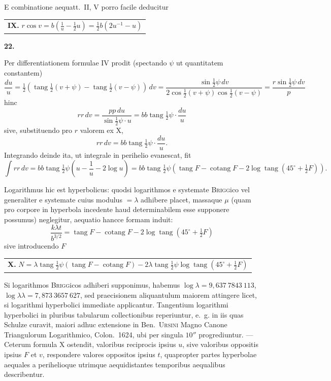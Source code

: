 \documentclass[12pt,a4paper]{book}
\newcommand{\tang}{\operatorname{tang}}
\newcommand{\cotang}{\operatorname{cotang}}
\begin{document}
E combinatione aequatt.~II, V porro facile deducitur

\begin{center}
\begin{tabular}{@{}l@{}}
\textbf{IX.} $r\cos v=b(\tfrac{1}{u}-\tfrac{1}{2}u)=\tfrac{1}{2}b(2u^{-1}-u)$
\end{tabular}
\end{center}

\textbf{22.}

Per differentiationem formulae IV prodit (spectando $\psi$ ut quantitatem constantem)
\[
\frac{du}{u}=\tfrac{1}{2}(\tang\tfrac{1}{2}(v+\psi)-\tang\tfrac{1}{2}(v-\psi))\,dv=\frac{\sin\tfrac{1}{2}\psi\,dv}{2\cos\tfrac{1}{2}(v+\psi)\cos\tfrac{1}{2}(v-\psi)}=\frac{r\sin\tfrac{1}{2}\psi\,dv}{p}
\]
hinc
\[
rr\,dv=\frac{pp\,du}{\sin\tfrac{1}{2}\psi\cdot u}=bb\tang\tfrac{1}{2}\psi\cdot\frac{du}{u}
\]
sive, substituendo pro $r$ valorem ex X,
\[
rr\,dv=bb\tang\tfrac{1}{2}\psi\cdot\frac{du}{u}.
\]
Integrando deinde ita, ut integrale in perihelio evanescat, fit
\[
\int rr\,dv=bb\tang\tfrac{1}{2}\psi\left(u-\frac{1}{u}-2\log u\right)=bb\tang\tfrac{1}{2}\psi\left(\tang F-\cotang F-2\log\tang(45^{\circ}+\tfrac{1}{2}F)\right).
\]

Logarithmus hic est hyperbolicus: quodsi logarithmos e systemate \textsc{Brigg}ico vel generaliter e systemate cuius modulus $=\lambda$ adhibere placet, massaque $\mu$ (quam pro corpore in hyperbola incedente haud determinabilem esse supponere possumus) neglegitur, aequatio hancce formam induit:
\[
\frac{k\lambda t}{b^{3/2}}=\tang F-\cotang F-2\log\tang(45^{\circ}+\tfrac{1}{2}F)
\]
sive introducendo $F$

\begin{center}
\begin{tabular}{@{}l@{}}
\textbf{X.} $N=\lambda\tang\tfrac{1}{2}\psi(\tang F-\cotang F)-2\lambda\tang\tfrac{1}{2}\psi\log\tang(45^{\circ}+\tfrac{1}{2}F)$
\end{tabular}
\end{center}

Si logarithmos \textsc{Brigg}icos adhiberi supponimus, habemus $\log\lambda=9{,}637\ 7843\ 113$, $\log\lambda\lambda=7{,}873\ 3657\ 627$, sed praecisionem aliquantulum maiorem attingere licet, si logarithmi hyperbolici immediate applicantur. Tangentium logarithmi hyperbolici in pluribus tabularum collectionibus reperiuntur, e.~g. in iis quas Schulze curavit, maiori adhuc extensione in Ben.~\textsc{Ursini} Magno Canone Triangulorum Logarithmico, Colon.~1624, ubi per singula $10''$ progrediuntur. --- Ceterum formula X ostendit, valoribus reciprocis ipsius $u$, sive valoribus oppositis ipsius $F$ et $v$, respondere valores oppositos ipsius $t$, quapropter partes hyperbolae aequales a perihelioque utrimque aequidistantes temporibus aequalibus describentur.
\end{document}

